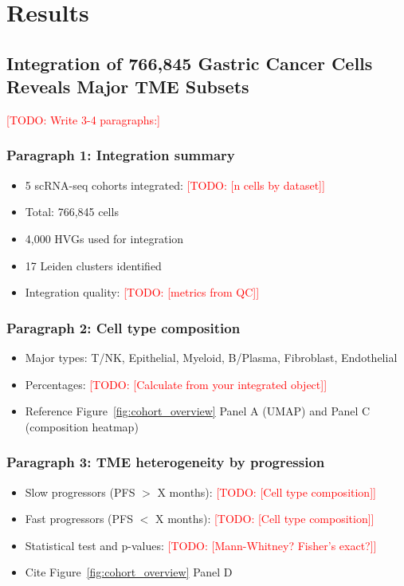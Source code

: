 \documentclass[12pt,oneside]{article}
\newcommand{\TODO}[1]{\textcolor{red}{[TODO: #1]}}
\newcommand{\FIG}[1]{Figure~\ref{fig:#1}}
\begin{document}
\section{Results}

\subsection{Integration of 766,845 Gastric Cancer Cells Reveals Major TME Subsets}
\TODO{Write 3-4 paragraphs:}

\subsubsection*{Paragraph 1: Integration summary}
\begin{itemize}
    \item 5 scRNA-seq cohorts integrated: \TODO{[n cells by dataset]}
    \item Total: 766,845 cells
    \item 4,000 HVGs used for integration
    \item 17 Leiden clusters identified
    \item Integration quality: \TODO{[metrics from QC]}
\end{itemize}

\subsubsection*{Paragraph 2: Cell type composition}
\begin{itemize}
    \item Major types: T/NK, Epithelial, Myeloid, B/Plasma, Fibroblast, Endothelial
    \item Percentages: \TODO{[Calculate from your integrated object]}
    \item Reference \FIG{cohort_overview} Panel A (UMAP) and Panel C (composition heatmap)
\end{itemize}

\subsubsection*{Paragraph 3: TME heterogeneity by progression}
\begin{itemize}
    \item Slow progressors (PFS $>$ X months): \TODO{[Cell type composition]}
    \item Fast progressors (PFS $<$ X months): \TODO{[Cell type composition]}
    \item Statistical test and p-values: \TODO{[Mann-Whitney? Fisher's exact?]}
    \item Cite \FIG{cohort_overview} Panel D
\end{itemize}
\end{document}
